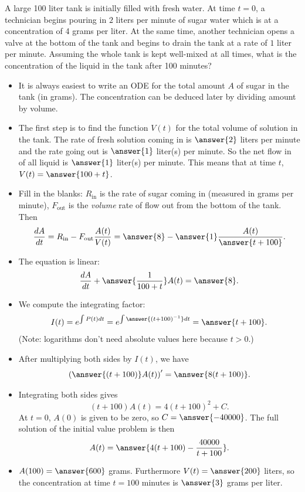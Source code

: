 \documentclass{ximera}
\begin{document}
\begin{example}
A large 100 liter tank is initially filled with fresh water. At time $t=0$, a technician begins pouring in $2$ liters per minute of sugar water which is at a concentration of 4 grams per liter. At the same time, another technician opens a valve at the bottom of the tank and begins to drain the tank at a rate of $1$ liter per minute. Assuming the whole tank is kept well-mixed at all times, what is the concentration of the liquid in the tank after 100 minutes?
\begin{itemize}
\item It is always easiest to write an ODE for the total amount $A$ of sugar in the tank (in grams). The concentration can be deduced later by dividing amount by volume.
\item The first step is to find the function $V(t)$ for the total volume of solution in the tank.  The rate of fresh solution coming in is $\answer{2}$ liters per minute and the rate going out is $\answer{1}$ liter(s) per minute. So the net flow in of all liquid is $\answer{1}$ liter(s) per minute. This means that at time $t$, $V(t) = \answer{100 + t}$.
\item Fill in the blanks: $R_{\mathrm{in}}$ is the rate of sugar coming in (measured in grams per minute), $F_{\mathrm{out}}$ is the \textit{volume} rate of flow out from the bottom of the tank. Then
\[ \frac{dA}{dt} = R_{\mathrm{in}} - F_{\mathrm{out}} \frac{A(t)}{V(t)} = \answer{8} - \answer{1} \frac{A(t)}{\answer{t+100}}.\]
\item The equation is linear:
\[ \frac{dA}{dt} + \answer{ \frac{1}{100 + t}} A(t) = \answer{8}. \]
\item We compute the integrating factor:
\[ I(t) = e^{\int P(t) dt} = e^{\int \answer{(t+100)^{-1}} dt} = \answer{t+100}. \]
(Note: logarithms don't need absolute values here because $t  > 0$.)
\item After multiplying both sides by $I(t)$, we have
\[ \left( \answer{(t+100)} A(t) \right)' = \answer{8 (t+100)}. \]
\item Integrating both sides gives
\[ (t+100) A(t) = 4 (t+100)^2 + C. \]
At $t = 0$, $A(0)$ is given to be zero, so $C = \answer{-40000}$. The full solution of the initial value problem is then
\[ A(t) = \answer{4 (t + 100) - \frac{40000}{t+100}}. \]
\item $A(100) = \answer{600}$ grams. Furthermore $V(t) = \answer{200}$ liters, so the concentration at time $t = 100$ minutes is $\answer{3}$ grams per liter.
\end{itemize}
\end{example}
\end{document}
